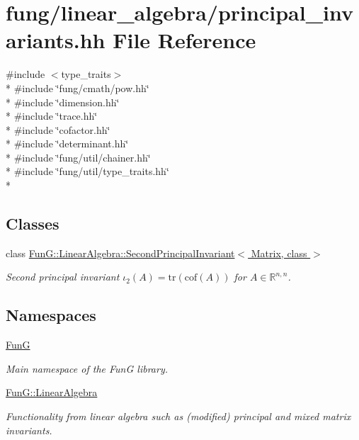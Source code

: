 \hypertarget{principal__invariants_8hh}{\section{fung/linear\-\_\-algebra/principal\-\_\-invariants.hh File Reference}
\label{principal__invariants_8hh}
}
{\ttfamily \#include $<$type\-\_\-traits$>$}\\*
{\ttfamily \#include \char`\"{}fung/cmath/pow.\-hh\char`\"{}}\\*
{\ttfamily \#include \char`\"{}dimension.\-hh\char`\"{}}\\*
{\ttfamily \#include \char`\"{}trace.\-hh\char`\"{}}\\*
{\ttfamily \#include \char`\"{}cofactor.\-hh\char`\"{}}\\*
{\ttfamily \#include \char`\"{}determinant.\-hh\char`\"{}}\\*
{\ttfamily \#include \char`\"{}fung/util/chainer.\-hh\char`\"{}}\\*
{\ttfamily \#include \char`\"{}fung/util/type\-\_\-traits.\-hh\char`\"{}}\\*
\subsection*{Classes}
\begin{DoxyCompactItemize}
\item 
class \hyperlink{classFunG_1_1LinearAlgebra_1_1SecondPrincipalInvariant}{Fun\-G\-::\-Linear\-Algebra\-::\-Second\-Principal\-Invariant$<$ Matrix, class $>$}
\begin{DoxyCompactList}\small\item\em Second principal invariant $ \iota_2(A)=\mathrm{tr}(\mathrm{cof}(A)) $ for $A\in\mathbb{R}^{n,n}$. \end{DoxyCompactList}\end{DoxyCompactItemize}
\subsection*{Namespaces}
\begin{DoxyCompactItemize}
\item 
\hyperlink{namespaceFunG}{Fun\-G}
\begin{DoxyCompactList}\small\item\em Main namespace of the Fun\-G library. \end{DoxyCompactList}\item 
\hyperlink{namespaceFunG_1_1LinearAlgebra}{Fun\-G\-::\-Linear\-Algebra}
\begin{DoxyCompactList}\small\item\em Functionality from linear algebra such as (modified) principal and mixed matrix invariants. \end{DoxyCompactList}\end{DoxyCompactItemize}
